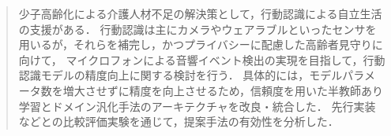 \documentclass[main]{subfiles}
\begin{document}
\begin{abstract}%
少子高齢化による介護人材不足の解決策として，行動認識による自立生活の支援がある．
行動認識は主にカメラやウェアラブルといったセンサを用いるが，それらを補完し，かつプライバシーに配慮した高齢者見守りに向けて，
マイクロフォンによる音響イベント検出の実現を目指して，行動認識モデルの精度向上に関する検討を行う．
具体的には，モデルパラメータ数を増大させずに精度を向上させるため，信頼度を用いた半教師あり学習とドメイン汎化手法のアーキテクチャを改良・統合した．
先行実装などとの比較評価実験を通じて，提案手法の有効性を分析した．
\end{abstract}
\end{document}
